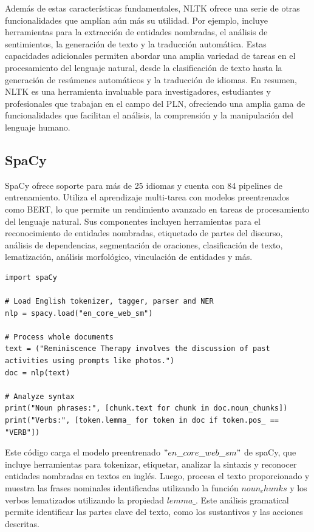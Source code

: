 Además de estas características fundamentales, NLTK ofrece una serie de otras funcionalidades que amplían aún más su utilidad. Por ejemplo, incluye herramientas para la extracción de entidades nombradas, el análisis de sentimientos, la generación de texto y la traducción automática. Estas capacidades adicionales permiten abordar una amplia variedad de tareas en el procesamiento del lenguaje natural, desde la clasificación de texto hasta la generación de resúmenes automáticos y la traducción de idiomas. En resumen, NLTK es una herramienta invaluable para investigadores, estudiantes y profesionales que trabajan en el campo del PLN, ofreciendo una amplia gama de funcionalidades que facilitan el análisis, la comprensión y la manipulación del lenguaje humano.


\subsection{SpaCy}


SpaCy ofrece soporte para más de 25 idiomas y cuenta con 84 pipelines de entrenamiento. Utiliza el aprendizaje multi-tarea con modelos preentrenados como BERT, lo que permite un rendimiento avanzado en tareas de procesamiento del lenguaje natural. Sus componentes incluyen herramientas para el reconocimiento de entidades nombradas, etiquetado de partes del discurso, análisis de dependencias, segmentación de oraciones, clasificación de texto, lematización, análisis morfológico, vinculación de entidades y más.

\begin{lstlisting}[style=SpyderStyle, caption={Ejemplo de tokenización usando spaCy}, captionpos=b, label={lst:python},breaklines = true]
import spaCy

# Load English tokenizer, tagger, parser and NER
nlp = spacy.load("en_core_web_sm")

# Process whole documents
text = ("Reminiscence Therapy involves the discussion of past activities using prompts like photos.")
doc = nlp(text)

# Analyze syntax
print("Noun phrases:", [chunk.text for chunk in doc.noun_chunks])
print("Verbs:", [token.lemma_ for token in doc if token.pos_ == "VERB"])
\end{lstlisting}

Este código carga el modelo preentrenado $"en\_core\_web\_sm"$ de spaCy, que incluye herramientas para tokenizar, etiquetar, analizar la sintaxis y reconocer entidades nombradas en textos en inglés. Luego, procesa el texto proporcionado y muestra las frases nominales identificadas utilizando la función $noun_chunks$ y los verbos lematizados utilizando la propiedad $lemma\_$. Este análisis gramatical permite identificar las partes clave del texto, como los sustantivos y las acciones descritas.

